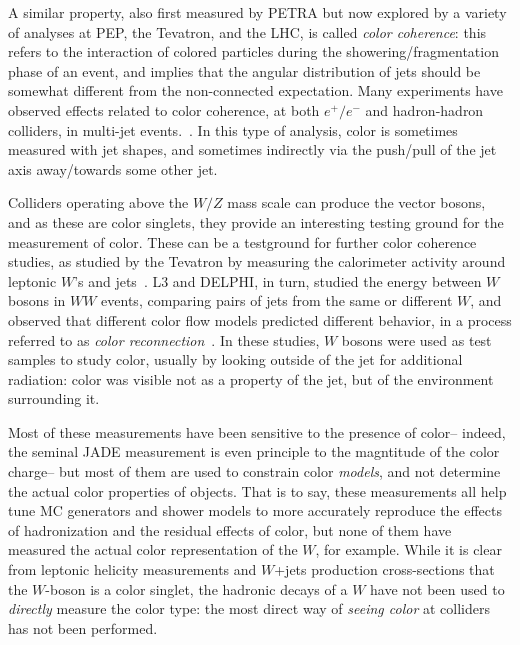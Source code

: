 A similar property, also first measured by PETRA but now explored by a variety of analyses at PEP, the Tevatron, and the LHC, is called \textit{color coherence}: this refers to the interaction of colored particles during the showering/fragmentation phase of an event, and implies that the angular distribution of jets should be somewhat different from the non-connected expectation. Many experiments have observed effects related to color coherence, at both $e^+/e^-$ and hadron-hadron colliders, in multi-jet events.~\cite{tasso,pep,PhysRevLett54270,PhysRevLett57945,PhysRevLett571398,PhysRevD.50.5562,Abbott:1997bk,Chatrchyan:2013fha}. In this type of analysis, color is sometimes measured with jet shapes, and sometimes indirectly via the push/pull of the jet axis away/towards some other jet.

Colliders operating above the $W/Z$ mass scale can produce the vector bosons, and as these are color singlets, they provide an interesting testing ground for the measurement of color. These can be a testground for further color coherence studies, as studied by the Tevatron by measuring the calorimeter activity around leptonic $W$'s and jets~\cite{Abbott:1999cu}.  L3 and DELPHI, in turn, studied the energy between $W$ bosons in $WW$ events, comparing pairs of jets from the same or different $W$, and observed that different color flow models predicted different behavior, in a process referred to as \textit{color reconnection}~\cite{Achard:2003pe,Abdallah:2006uq}. In these studies, $W$ bosons were used as test samples to study color, usually by looking outside of the jet for additional radiation: color was visible not as a property of the jet, but of the environment surrounding it.

Most of these measurements have been sensitive to the presence of color-- indeed, the seminal JADE measurement is even principle to the magntitude of the color charge-- but most of them are used to constrain color \textit{models}, and not determine the actual color properties of objects. That is to say, these measurements all help tune MC generators and shower models to more accurately reproduce the effects of hadronization and the residual effects of color, but none of them have measured the actual color representation of the $W$, for example. While it is clear from leptonic helicity measurements and $W$+jets production cross-sections that the $W$-boson is a color singlet, the hadronic decays of a $W$ have not been used to \textit{directly} measure the color type: the most direct way of \textit{seeing color} at colliders has not been performed.

